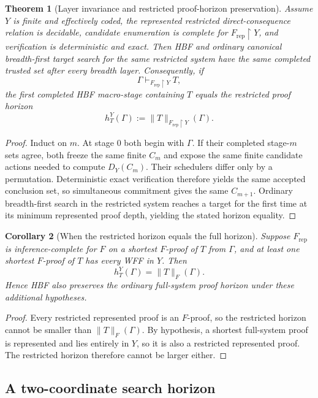 \documentclass[11pt]{article}
\newtheorem{theorem}{Theorem}[section]
\newtheorem{corollary}[theorem]{Corollary}
\theoremstyle{definition}
\begin{document}
\begin{theorem}[Layer invariance and restricted proof-horizon preservation]\label{thm:hbf-layer}
Assume $Y$ is finite and effectively coded, the represented restricted direct-consequence relation is decidable, candidate enumeration is complete for $F_{\mathrm{rep}}\!\upharpoonright\!Y$, and verification is deterministic and exact. Then HBF and ordinary canonical breadth-first target search for the same restricted system have the same completed trusted set after every breadth layer. Consequently, if
\[
\Gamma\vdash_{F_{\mathrm{rep}}\upharpoonright Y}T,
\]
the first completed HBF macro-stage containing $T$ equals the restricted proof horizon
\[
h_T^Y(\Gamma)
:=
\|T\|_{F_{\mathrm{rep}}\upharpoonright Y}(\Gamma).
\]
\end{theorem}

\begin{proof}
Induct on $m$. At stage $0$ both begin with $\Gamma$. If their completed stage-$m$ sets agree, both freeze the same finite $C_m$ and expose the same finite candidate actions needed to compute $D_Y(C_m)$. Their schedulers differ only by a permutation. Deterministic exact verification therefore yields the same accepted conclusion set, so simultaneous commitment gives the same $C_{m+1}$. Ordinary breadth-first search in the restricted system reaches a target for the first time at its minimum represented proof depth, yielding the stated horizon equality.
\end{proof}

\begin{corollary}[When the restricted horizon equals the full horizon]\label{cor:y-full-horizon}
Suppose $F_{\mathrm{rep}}$ is inference-complete for $F$ on a shortest $F$-proof of $T$ from $\Gamma$, and at least one shortest $F$-proof of $T$ has every WFF in $Y$. Then
\[
h_T^Y(\Gamma)=\|T\|_F(\Gamma).
\]
Hence HBF also preserves the ordinary full-system proof horizon under these additional hypotheses.
\end{corollary}

\begin{proof}
Every restricted represented proof is an $F$-proof, so the restricted horizon cannot be smaller than $\|T\|_F(\Gamma)$. By hypothesis, a shortest full-system proof is represented and lies entirely in $Y$, so it is also a restricted represented proof. The restricted horizon therefore cannot be larger either.
\end{proof}

\subsection{A two-coordinate search horizon}
\end{document}
